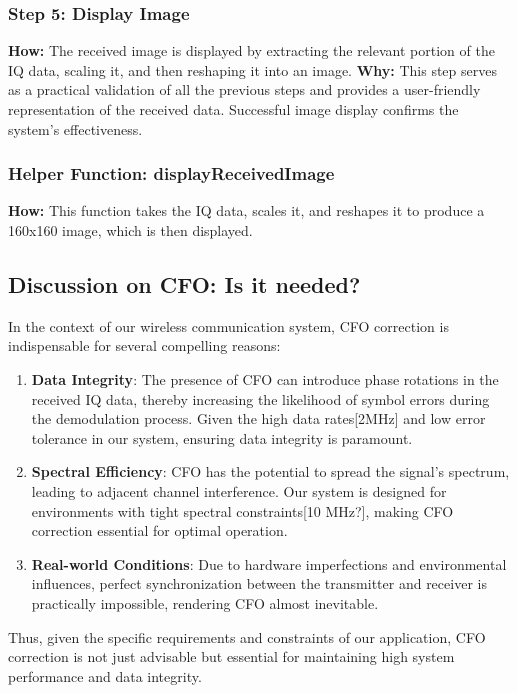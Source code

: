\documentclass{article}
\begin{document}
\subsubsection*{Step 5: Display Image}
\textbf{How:}
The received image is displayed by extracting the relevant portion of the IQ data, scaling it, and then reshaping it into an image.
\newline \textbf{Why:}
This step serves as a practical validation of all the previous steps and provides a user-friendly representation of the received data. Successful image display confirms the system's effectiveness.

\subsubsection*{Helper Function: displayReceivedImage}
\textbf{How:}
This function takes the IQ data, scales it, and reshapes it to produce a 160x160 image, which is then displayed.
\newpage
\subsection*{Discussion on CFO: Is it needed?}
In the context of our wireless communication system, CFO correction is indispensable for several compelling reasons:

\begin{enumerate}
    \item \textbf{Data Integrity}: The presence of CFO can introduce phase rotations in the received IQ data, thereby increasing the likelihood of symbol errors during the demodulation process. Given the high data rates[2MHz] and low error tolerance in our system, ensuring data integrity is paramount.
    
    \item \textbf{Spectral Efficiency}: CFO has the potential to spread the signal's spectrum, leading to adjacent channel interference. Our system is designed for environments with tight spectral constraints[10 MHz?], making CFO correction essential for optimal operation.
    
    \item \textbf{Real-world Conditions}: Due to hardware imperfections and environmental influences, perfect synchronization between the transmitter and receiver is practically impossible, rendering CFO almost inevitable.
\end{enumerate}

Thus, given the specific requirements and constraints of our application, CFO correction is not just advisable but essential for maintaining high system performance and data integrity.
\end{document}
